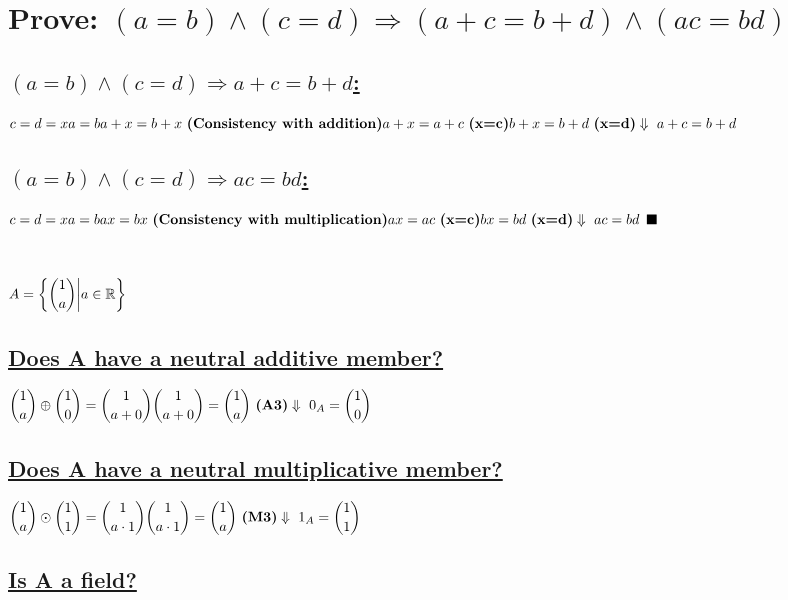 \documentclass[a4paper, 12pt]{article}
\newcommand{\sub}[1]{\subsection{\underline{#1}}}
\renewcommand{\qed}{\ensuremath{\blacksquare\pagebreak}}
\renewcommand{\b}[1]{\textbf{#1}}
\renewcommand{\because}[1]{~\b{(#1)}\\}
\renewcommand{\d}{\ensuremath{\Downarrow\\~}}
\begin{document}
\section{Prove: $ (a=b) \land (c=d) \Rightarrow (a+c=b+d) \land (ac=bd) $}

\sub{$ (a=b) \land (c=d) \Rightarrow a+c=b+d $:}
$
    c=d=x \\
    a=b \\
    a+x=b+x \because{Consistency with addition}
    a+x=a+c \because{x=c}
    b+x=b+d \because{x=d}
    \d
    a+c=b+d\\
$

\sub{$ (a=b) \land (c=d) \Rightarrow ac=bd $:}
$
    c=d=x \\
    a=b \\
    ax=bx \because{Consistency with multiplication}
    ax=ac \because{x=c}
    bx=bd \because{x=d}
    \d
    ac=bd\\
$
\qed

\section{$ A=\bigg{\{} \dbinom{1}{a} \bigg{|} a\in{\mathbb{R} }\bigg{\}} $}
\sub{Does A have a neutral additive member?}
$
    \dbinom{1}{a} \oplus \dbinom{1}{0} = \dbinom{1}{a+0} \\
    \dbinom{1}{a+0} = \dbinom{1}{a} \because{A3}
    \d
    0_{A} = \dbinom{1}{0}
$

\sub{Does A have a neutral multiplicative member?}
$
    \dbinom{1}{a} \odot \dbinom{1}{1} = \dbinom{1}{a \cdot{1}} \\
    \dbinom{1}{a \cdot{1}} = \dbinom{1}{a} \because{M3}
    \d
    1_{A} = \dbinom{1}{1}
$

\sub{Is A a field?}


\end{document}
